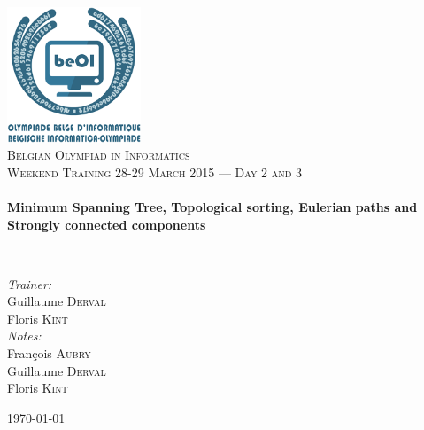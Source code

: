 \begin{titlepage}
\begin{center}

\includegraphics[width=0.3\textwidth]{./img/beoi-logo}~\\[1cm]

\textsc{\LARGE Belgian Olympiad in Informatics}\\[1.5cm]

\textsc{\Large Weekend Training 28-29 March 2015 --- Day 2 and 3}\\[0.5cm]

\HRule \\[0.4cm]
{ \huge \bfseries Minimum Spanning Tree, Topological sorting, Eulerian paths and Strongly connected components \\[0.4cm] }

\HRule \\[1.5cm]

\begin{center} \large
\emph{Trainer:}\\
Guillaume \textsc{Derval}\\
Floris \textsc{Kint}\\
\emph{Notes:}\\
François \textsc{Aubry}\\
Guillaume \textsc{Derval}\\
Floris \textsc{Kint}
\end{center}

\vfill

{\large \today}

\end{center}
\end{titlepage}